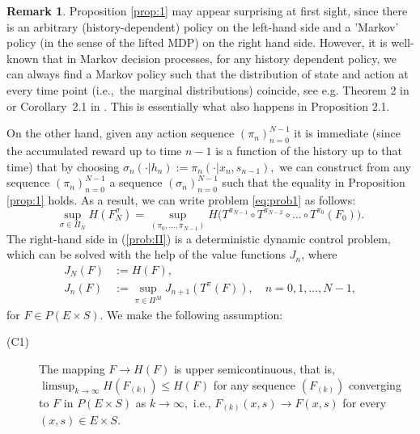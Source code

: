 \documentclass[reqno, 12pt]{amsart}%
\newcommand{\R}{\mathbb{R}} %
\theoremstyle{definition}
\newtheorem{remark}[theorem]{Remark}
\numberwithin{equation}{section} \numberwithin{theorem}{section}
\begin{document}
\begin{remark} \label{rem23}
    Proposition \ref{prop:1} may appear surprising at first sight, since there is an arbitrary (history-dependent) policy on the left-hand side and a 'Markov' policy (in the sense of the lifted MDP) on the right hand side. However, it is well-known that in Markov decision processes, for any history dependent policy, we can always find  a Markov policy such that the distribution of state and action at every time point (i.e.,\ the marginal distributions) coincide, see e.g. Theorem 2 in \cite{derman1966note} or Corollary~2.1 in \cite{kallenberg2002finite}. This is essentially what also happens in Proposition 2.1.
\end{remark}

 On the other hand, given any action sequence $(\pi_n)_{n=0}^{N-1}$ it is immediate (since the accumulated reward up to time $n-1$ is a function of the history up to that time)  that by choosing $\sigma_n(\cdot|h_n) := \pi_n(\cdot|x_n,s_{n-1}), $ we can construct from any sequence $(\pi_n)_{n=0}^{N-1}$ a sequence $(\sigma_n)_{n=0}^{N-1}$ such that the equality in Proposition \ref{prop:1} holds. As a result, we can write problem \eqref{eq:prob1} as follows:
\begin{equation}\label{prob:II}
    \sup_{\sigma\in \Pi_N} H(F_N^\sigma) = \sup_{(\pi_0,\ldots, \pi_{N-1})} H\big(T^{\pi_{N-1}}\circ T^{\pi_{N-2}} \circ \ldots \circ T^{\pi_0}(F_0)\big).
\end{equation} 
The right-hand side in (\ref{prob:II}) is a 
deterministic dynamic control problem, which can be 
solved with the help of the value functions $J_n$, 
where 
\begin{align}
  \nonumber  J_N(F) & := H(F),\\ \label{eq:OE}
    J_n(F) &:= \sup_{\pi\in \Pi^M} J_{n+1}(T^\pi(F)),\quad n=0,1,\ldots ,N-1, %
\end{align}
for $F\in P(E\times S).$
We make the following assumption:
\begin{description}
\item[(C1)] The mapping $F\to H(F)$ is upper 
semicontinuous, that is,
$\limsup_{k\to\infty} H(F_{(k)}) \le H(F)$
for any sequence $(F_{(k)})$ converging to $F$ in
$P(E\times S)$ as $k\to\infty,$ i.e., 
$F_{(k)}(x,s)\to F(x,s)$ for every $(x,s)\in E\times S.$
\end{description}
\end{document}
